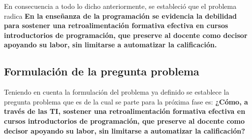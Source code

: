 \documentclass[letterpaper, 10 pt, conference]{ieeeconf}
\begin{document}
    En consecuencia a todo lo dicho anteriormente, se estableció que el problema radica \textbf{En la enseñanza de la programación se evidencia la debilidad para sostener una retroalimentación formativa efectiva en cursos introductorios de programación, que preserve al docente como decisor apoyando su labor, sin limitarse a automatizar la calificación.}

    
    \subsection{Formulación de la pregunta problema}
    Teniendo en cuenta la formulación del problema ya definido se establece la pregunta problema que es de la cual se parte para la próxima fase es: \textbf{ ¿Cómo, a través de las TI, sostener una retroalimentación formativa efectiva en cursos introductorios de programación, que preserve al docente como decisor apoyando su labor, sin limitarse a automatizar la calificación?}


    


\addtolength{\textheight}{-12cm}   %







\end{document}
